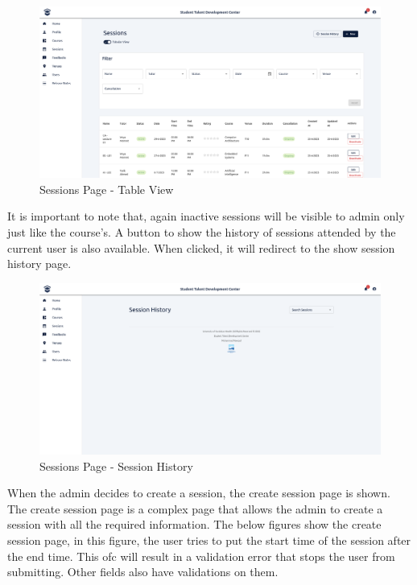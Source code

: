 \begin{justify}
    \begin{figure}[H]
        \centerline{\includegraphics[width=150mm,scale=1]{figures/implementation_and_testing/implementation/frontend/pages/Session - Table.png}}
        \caption{Sessions Page - Table View}
    \end{figure}

    \vspace{0.25cm} It is important to note that, again inactive sessions will be visible to admin only just like the course's. A button to show the history of sessions attended by the current user is also available. When clicked, it will redirect to the show session history page.

    \begin{figure}[H]
        \centerline{\includegraphics[width=150mm,scale=1]{figures/implementation_and_testing/implementation/frontend/pages/Session - History.png}}
        \caption{Sessions Page - Session History}
    \end{figure}

    \vspace{0.25cm}
    \newendline When the admin decides to create a session, the create session page is shown. The create session page is a complex page that allows the admin to create a session with all the required information. The below figures show the create session page, in this figure, the user tries to put the start time of the session after the end time. This ofc will result in a validation error that stops the user from submitting. Other fields also have validations on them.


\end{justify}
